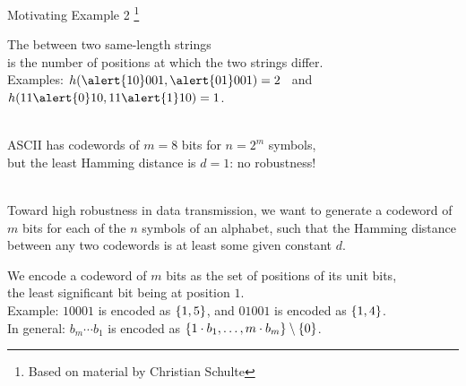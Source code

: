 \documentclass{cons-beamer}
\begin{document}
\begin{flashcardminizinc}
\begin{frame}[fragile]
  \begin{example}
    \footnotesize
    
  \end{example}
  \begin{example}
    \footnotesize
    
  \end{example}
\end{frame}

\begin{frame}{Motivating Example 2 \footnote{Based on material by
      Christian Schulte}}\label{Hamming}
  \begin{example}
    The  between two same-length strings \\
    is the number of positions at which the two strings differ. \\
    Examples: $h(\alert{10}001,\alert{01}001) = 2$ ~and~
    $h(11\alert{0}10,11\alert{1}10) = 1$. \\~
    
    ASCII has codewords of $m = 8$ bits for $n = 2^m$ symbols, \\ but
    the least Hamming distance is $d = 1$: no robustness! \\~

    Toward high robustness in data transmission, we want to generate a
    codeword of $m$ bits for each of the $n$ symbols of an alphabet,
    such that the Hamming distance between any two codewords is at
    least some given constant $d$. 
  \end{example}
\end{frame}

\begin{frame}[fragile]
  \begin{example}
    We encode a codeword of $m$ bits as  the set of positions
    of its unit bits, \\ the least significant bit being at position
    $1$. \\ Example: $10001$ is encoded as $\left\{1,5\right\}$, and $01001$ is
    encoded as $\left\{1,4\right\}$. \\  In general: $b_m \cdots b_1$
    is encoded as
    $\left\{1 \cdot b_1, \dots, m \cdot b_m\right\} \setminus \left\{0\right\}$.


\end{example}
\end{frame}
\end{flashcardminizinc}
\end{document}
